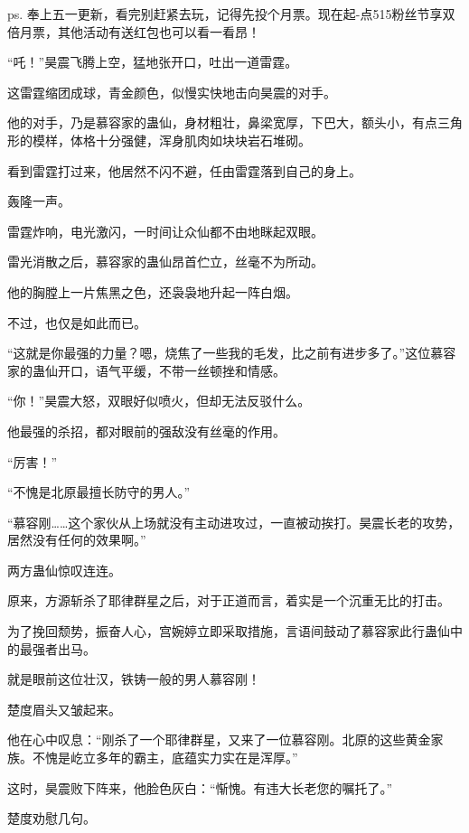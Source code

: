 
\begin{this_body}

ps. 奉上五一更新，看完别赶紧去玩，记得先投个月票。现在起-点515粉丝节享双倍月票，其他活动有送红包也可以看一看昂！

“吒！”昊震飞腾上空，猛地张开口，吐出一道雷霆。

这雷霆缩团成球，青金颜色，似慢实快地击向昊震的对手。

他的对手，乃是慕容家的蛊仙，身材粗壮，鼻梁宽厚，下巴大，额头小，有点三角形的模样，体格十分强健，浑身肌肉如块块岩石堆砌。

看到雷霆打过来，他居然不闪不避，任由雷霆落到自己的身上。

轰隆一声。

雷霆炸响，电光激闪，一时间让众仙都不由地眯起双眼。

雷光消散之后，慕容家的蛊仙昂首伫立，丝毫不为所动。

他的胸膛上一片焦黑之色，还袅袅地升起一阵白烟。

不过，也仅是如此而已。

“这就是你最强的力量？嗯，烧焦了一些我的毛发，比之前有进步多了。”这位慕容家的蛊仙开口，语气平缓，不带一丝顿挫和情感。

“你！”昊震大怒，双眼好似喷火，但却无法反驳什么。

他最强的杀招，都对眼前的强敌没有丝毫的作用。

“厉害！”

“不愧是北原最擅长防守的男人。”

“慕容刚……这个家伙从上场就没有主动进攻过，一直被动挨打。昊震长老的攻势，居然没有任何的效果啊。”

两方蛊仙惊叹连连。

原来，方源斩杀了耶律群星之后，对于正道而言，着实是一个沉重无比的打击。

为了挽回颓势，振奋人心，宫婉婷立即采取措施，言语间鼓动了慕容家此行蛊仙中的最强者出马。

就是眼前这位壮汉，铁铸一般的男人慕容刚！

楚度眉头又皱起来。

他在心中叹息：“刚杀了一个耶律群星，又来了一位慕容刚。北原的这些黄金家族。不愧是屹立多年的霸主，底蕴实力实在是浑厚。”

这时，昊震败下阵来，他脸色灰白：“惭愧。有违大长老您的嘱托了。”

楚度劝慰几句。


\end{this_body}
